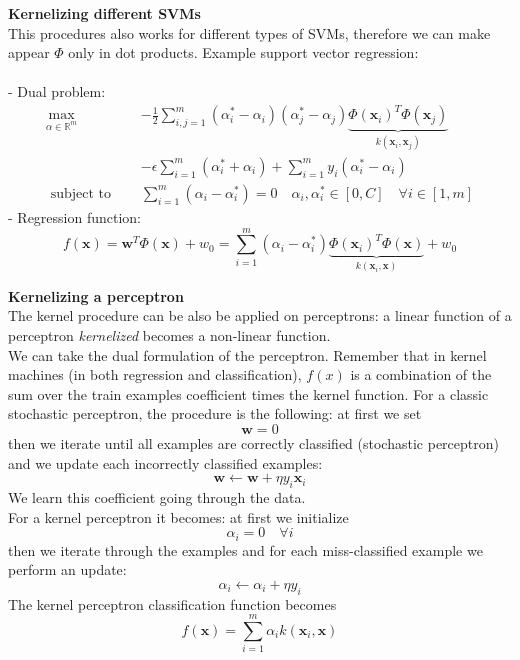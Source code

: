 \textbf{Kernelizing different SVMs}\\ This procedures also works for different
types of SVMs, therefore we can make appear $\Phi$ only in dot products. Example
support vector regression: \\ \\ - Dual problem:
\[
	\begin{aligned}
		\max_{\alpha \in \mathbb{R}^m} & -\frac{1}{2}\sum_{i, j=1}^{m}\left(\alpha_{i}^{*}-\alpha_{i}\right)\left(\alpha_{j}^{*}-\alpha_{j}\right) \underbrace{\Phi\left(\mathbf{x}_i\right)^T \Phi\left(\mathbf{x}_j\right)}_{k\left(\mathbf{x}_i, \mathbf{x}_j\right)} \\
		                               & -\epsilon \sum_{i=1}^{m}\left(\alpha_{i}^{*}+\alpha_{i}\right)+\sum_{i=1}^{m}y_{i}\left(\alpha_{i}^{*}-\alpha_{i}\right)                                                                                                        \\
		\text{ subject to }\quad       & \sum_{i=1}^{m}\left(\alpha_{i}-\alpha_{i}^{*}\right)=0 \quad \alpha_{i}, \alpha_{i}^{*}\in[0, C] \quad \forall i \in[1, m]
	\end{aligned}
\]
- Regression function:
\[
	f(\mathbf{x})=\mathbf{w}^{T}\Phi(\mathbf{x})+w_{0}=\sum_{i=1}^{m}\left(\alpha_{i}
	-\alpha_{i}^{*}\right) \underbrace{\Phi\left(\mathbf{x}_i\right)^T \Phi(\mathbf{x})}
	_{k\left(\mathbf{x}_i, \mathbf{x}\right)}+w_{0}
\]

\textbf{Kernelizing a perceptron}\\ The kernel procedure can be also be applied
on perceptrons: a linear function of a perceptron \textit{kernelized} becomes a
non-linear function.\\ We can take the dual formulation of the perceptron. Remember
that in kernel machines (in both regression and classification), $f(x)$ is a
combination of the sum over the train examples coefficient times the kernel
function. For a classic stochastic perceptron, the procedure is the following: at
first we set
\[
	\pmb{w}= 0
\]
then we iterate until all examples are correctly classified (stochastic
perceptron) and we update each incorrectly classified examples:
\[
	\pmb{w}\leftarrow \pmb{w}+ \eta y_{i}\pmb{x}_{i}
\]
We learn this coefficient going through the data. \\

For a kernel perceptron it becomes: at first we initialize
\[
	\alpha_{i}= 0 \quad \forall i
\]
then we iterate through the examples and for each miss-classified example we perform
an update:
\[
	\alpha_{i}\leftarrow \alpha_{i}+ \eta y_{i}
\]
The kernel perceptron classification function becomes
\[
	f(\pmb{x}) = \sum_{i=1}^{m}\alpha_{i}k(\pmb{x}_{i}, \pmb{x})
\]


